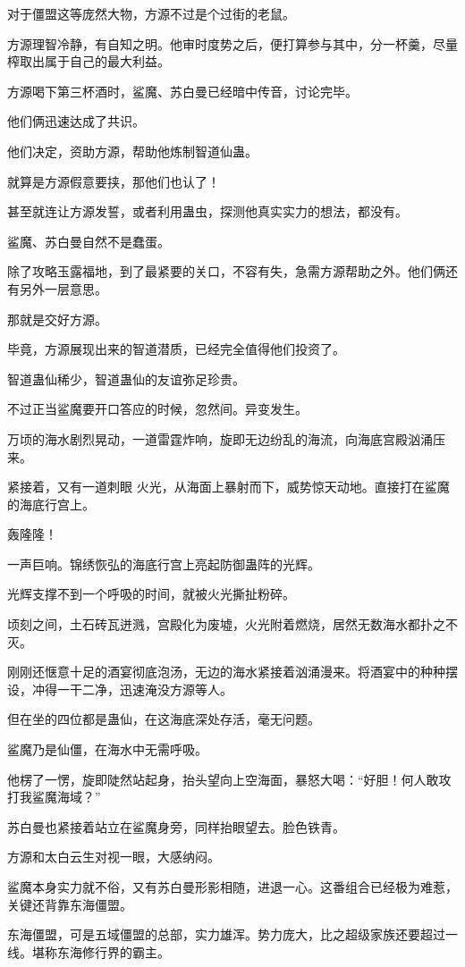 \begin{this_body}
对于僵盟这等庞然大物，方源不过是个过街的老鼠。

方源理智冷静，有自知之明。他审时度势之后，便打算参与其中，分一杯羹，尽量榨取出属于自己的最大利益。

方源喝下第三杯酒时，鲨魔、苏白曼已经暗中传音，讨论完毕。

他们俩迅速达成了共识。

他们决定，资助方源，帮助他炼制智道仙蛊。

就算是方源假意要挟，那他们也认了！

甚至就连让方源发誓，或者利用蛊虫，探测他真实实力的想法，都没有。

鲨魔、苏白曼自然不是蠢蛋。

除了攻略玉露福地，到了最紧要的关口，不容有失，急需方源帮助之外。他们俩还有另外一层意思。

那就是交好方源。

毕竟，方源展现出来的智道潜质，已经完全值得他们投资了。

智道蛊仙稀少，智道蛊仙的友谊弥足珍贵。

不过正当鲨魔要开口答应的时候，忽然间。异变发生。

万顷的海水剧烈晃动，一道雷霆炸响，旋即无边纷乱的海流，向海底宫殿汹涌压来。

紧接着，又有一道刺眼 火光，从海面上暴射而下，威势惊天动地。直接打在鲨魔的海底行宫上。

轰隆隆！

一声巨响。锦绣恢弘的海底行宫上亮起防御蛊阵的光辉。

光辉支撑不到一个呼吸的时间，就被火光撕扯粉碎。

顷刻之间，土石砖瓦迸溅，宫殿化为废墟，火光附着燃烧，居然无数海水都扑之不灭。

刚刚还惬意十足的酒宴彻底泡汤，无边的海水紧接着汹涌漫来。将酒宴中的种种摆设，冲得一干二净，迅速淹没方源等人。

但在坐的四位都是蛊仙，在这海底深处存活，毫无问题。

鲨魔乃是仙僵，在海水中无需呼吸。

他楞了一愣，旋即陡然站起身，抬头望向上空海面，暴怒大喝：“好胆！何人敢攻打我鲨魔海域？”

苏白曼也紧接着站立在鲨魔身旁，同样抬眼望去。脸色铁青。

方源和太白云生对视一眼，大感纳闷。

鲨魔本身实力就不俗，又有苏白曼形影相随，进退一心。这番组合已经极为难惹，关键还背靠东海僵盟。

东海僵盟，可是五域僵盟的总部，实力雄浑。势力庞大，比之超级家族还要超过一线。堪称东海修行界的霸主。


\end{this_body}
